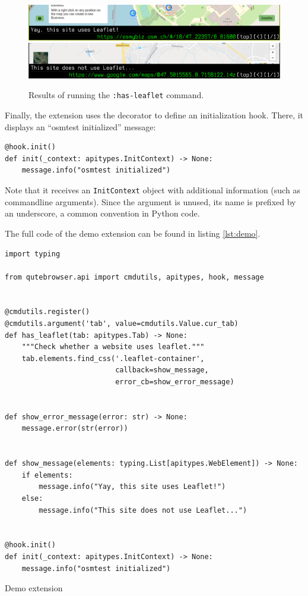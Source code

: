 \begin{figure}[H]
  \centering
  \includegraphics[width=\linewidth]{img/screenshot-leaflet.png} \\[2em]
  \includegraphics[width=\linewidth]{img/screenshot-leaflet-no.png}
  \caption{Results of running the \texttt{:has-leaflet} command.}
\end{figure}

Finally, the extension uses the  decorator to define an
initialization hook. There, it displays an ``osmtest initialized'' message:

\begin{verbatim}
@hook.init()
def init(_context: apitypes.InitContext) -> None:
    message.info("osmtest initialized")
\end{verbatim}

Note that it receives an \verb|InitContext| object with additional information
(such as commandline arguments). Since the argument is unused, its name is
prefixed by an underscore, a common convention in Python code.

The full code of the demo extension can be found in listing \ref{lst:demo}.

\begin{listing}[H]
\centering
\begin{verbatim}
import typing

from qutebrowser.api import cmdutils, apitypes, hook, message


@cmdutils.register()
@cmdutils.argument('tab', value=cmdutils.Value.cur_tab)
def has_leaflet(tab: apitypes.Tab) -> None:
    """Check whether a website uses leaflet."""
    tab.elements.find_css('.leaflet-container',
                          callback=show_message,
                          error_cb=show_error_message)


def show_error_message(error: str) -> None:
    message.error(str(error))


def show_message(elements: typing.List[apitypes.WebElement]) -> None:
    if elements:
        message.info("Yay, this site uses Leaflet!")
    else:
        message.info("This site does not use Leaflet...")


@hook.init()
def init(_context: apitypes.InitContext) -> None:
    message.info("osmtest initialized")
\end{verbatim}
\caption{Demo extension}
\label{lst:demo}
\end{listing}

